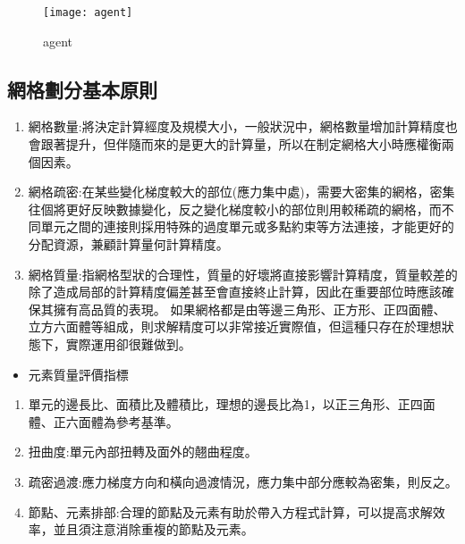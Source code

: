  
\iffalse
\begin{figure}[hbt!]
\begin{center}
\texttt{[image:  Reinforcement\_Learning\_interactions]}
\caption{\Large Reinforcement Learning interactions}
\end{center}
\end{figure}
\fi


\begin{figure}[hbt!]
\begin{center}
\texttt{[image: agent]}
\caption{\Large agent}
\label{agent}
\end{center}
\end{figure}
\begin{flushleft}
\end{flushleft}
\newpage


\subsection{網格劃分基本原則}
\begin{enumerate}
\item 網格數量:將決定計算經度及規模大小，一般狀況中，網格數量增加計算精度也會跟著提升，但伴隨而來的是更大的計算量，所以在制定網格大小時應權衡兩個因素。
\item 網格疏密:在某些變化梯度較大的部位(應力集中處)，需要大密集的網格，密集往個將更好反映數據變化，反之變化梯度較小的部位則用較稀疏的網格，而不同單元之間的連接則採用特殊的過度單元或多點約束等方法連接，才能更好的分配資源，兼顧計算量何計算精度。
\item 網格質量:指網格型狀的合理性，質量的好壞將直接影響計算精度，質量較差的除了造成局部的計算精度偏差甚至會直接終止計算，因此在重要部位時應該確保其擁有高品質的表現。
如果網格都是由等邊三角形、正方形、正四面體、立方六面體等組成，則求解精度可以非常接近實際值，但這種只存在於理想狀態下，實際運用卻很難做到。
\end{enumerate}

\begin{itemize}
\item 元素質量評價指標
\end{itemize}
\begin{enumerate}
\item 單元的邊長比、面積比及體積比，理想的邊長比為1，以正三角形、正四面體、正六面體為參考基準。
\item 扭曲度:單元內部扭轉及面外的翹曲程度。
\item 疏密過渡:應力梯度方向和橫向過渡情況，應力集中部分應較為密集，則反之。
\item 節點、元素排部:合理的節點及元素有助於帶入方程式計算，可以提高求解效率，並且須注意消除重複的節點及元素。
\end{enumerate}
